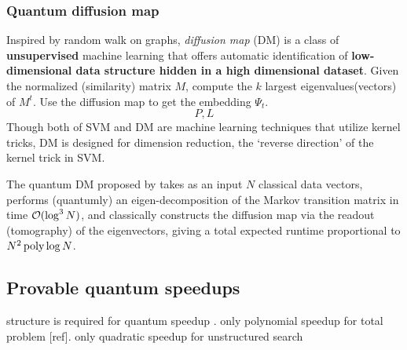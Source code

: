 \subsubsection{Quantum diffusion map}
Inspired by random walk on graphs, \emph{diffusion map} (DM) is a class of \textbf{unsupervised} machine learning that offers automatic identification of \textbf{low-dimensional data structure hidden in a high dimensional dataset}.
Given the normalized (similarity) matrix $M$, 
compute the $k$ largest eigenvalues(vectors) of $M^t$.
Use the diffusion map to get the embedding $\Psi_t$.
\begin{equation}
	P, L
\end{equation}
Though both of SVM and DM are machine learning techniques that utilize kernel tricks, DM is designed for dimension reduction, the `reverse direction' of the kernel trick in SVM.

The quantum DM proposed by \cite{sornsaengQuantumDiffusionMap2021} takes as an input $N$ classical data vectors, 
performs (quantumly) an eigen-decomposition of the Markov transition matrix in time $\mathcal{O}(\log^3 N)$, 
and classically constructs the diffusion map via the readout (tomography) of the eigenvectors, giving a total expected runtime proportional to $N^2 \operatorname{\textup{poly}}\log N$.


\subsection{Provable quantum speedups}
structure is required for quantum speedup
\cite{aaronsonNeedStructureQuantum2014}.
only polynomial speedup for total problem [ref].
only quadratic speedup for unstructured search \cite{groverQuantumMechanicsHelps1997}

